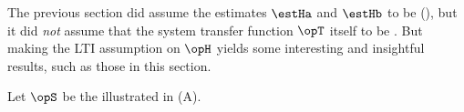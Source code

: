 The previous section did assume the estimates $\estHa$ and $\estHb$  to be
 (), but it did \emph{not} assume that
the system transfer function $\opT$ itself to be .
But making the LTI assumption on $\opH$ yields some interesting and insightful
results, such as those in this section.

\begin{theorem}
\label{thm:estH1_cnoise}
\label{thm:estH2_cnoise}
Let $\opS$ be the  illustrated in  (A).
\end{theorem}

